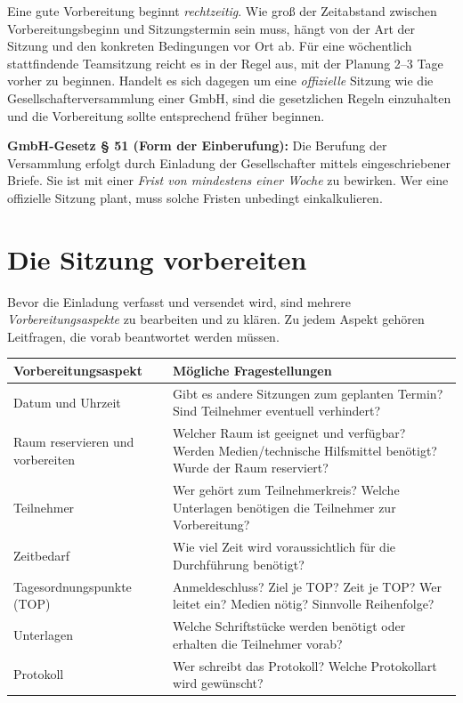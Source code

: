 \documentclass[11pt, a4paper]{article}
\begin{document}
Eine gute Vorbereitung beginnt \emph{rechtzeitig}. Wie groß der Zeitabstand zwischen
Vorbereitungsbeginn und Sitzungstermin sein muss, hängt von der Art der Sitzung und den
konkreten Bedingungen vor Ort ab. Für eine wöchentlich stattfindende Teamsitzung reicht es
in der Regel aus, mit der Planung 2--3 Tage vorher zu beginnen. Handelt es sich dagegen um
eine \emph{offizielle} Sitzung wie die Gesellschafterversammlung einer GmbH, sind die
gesetzlichen Regeln einzuhalten und die Vorbereitung sollte entsprechend früher beginnen.

\begin{beispiel}
\textbf{GmbH-Gesetz § 51 (Form der Einberufung):} Die Berufung der Versammlung erfolgt durch
Einladung der Gesellschafter mittels eingeschriebener Briefe. Sie ist mit einer \emph{Frist
von mindestens einer Woche} zu bewirken. Wer eine offizielle Sitzung plant, muss solche
Fristen unbedingt einkalkulieren.
\end{beispiel}

\section{Die Sitzung vorbereiten}

Bevor die Einladung verfasst und versendet wird, sind mehrere \emph{Vorbereitungsaspekte} zu
bearbeiten und zu klären. Zu jedem Aspekt gehören Leitfragen, die vorab beantwortet werden
müssen.

\begin{center}
\begin{tabular}{p{4.2cm} p{9.0cm}}
\toprule
\textbf{Vorbereitungsaspekt} & \textbf{Mögliche Fragestellungen}\\
\midrule
Datum und Uhrzeit & Gibt es andere Sitzungen zum geplanten Termin? Sind Teilnehmer eventuell verhindert?\\
Raum reservieren und vorbereiten & Welcher Raum ist geeignet und verfügbar? Werden Medien/technische Hilfsmittel benötigt? Wurde der Raum reserviert?\\
Teilnehmer & Wer gehört zum Teilnehmerkreis? Welche Unterlagen benötigen die Teilnehmer zur Vorbereitung?\\
Zeitbedarf & Wie viel Zeit wird voraussichtlich für die Durchführung benötigt?\\
Tagesordnungspunkte (TOP) & Anmeldeschluss? Ziel je TOP? Zeit je TOP? Wer leitet ein? Medien nötig? Sinnvolle Reihenfolge?\\
Unterlagen & Welche Schriftstücke werden benötigt oder erhalten die Teilnehmer vorab?\\
Protokoll & Wer schreibt das Protokoll? Welche Protokollart wird gewünscht?\\
\bottomrule
\end{tabular}
\end{center}
\end{document}
